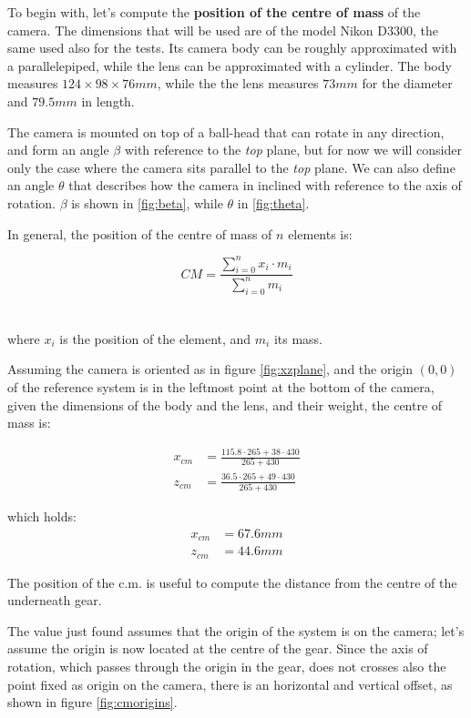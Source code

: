 \documentclass[]{article}
\begin{document}
To begin with, let's compute the \textbf{position of the centre of mass } of the camera. The dimensions that will be used are of the model Nikon D3300, the same used also for the tests. Its camera body can be roughly approximated with a parallelepiped, while the lens can be approximated with a cylinder. The body measures $124 \times 98 \times 76 mm$, while the the lens measures $73mm $ for the diameter and $79.5 mm$ in length.

The camera is mounted on top of a ball-head that can rotate in any direction, and form an angle $\beta$ with reference to the \textit{top} plane, but for now we will consider only the case where the camera sits parallel to the \textit{top} plane. We can also define an angle $\theta$ that describes how the camera in inclined with reference to the axis of rotation. $\beta$ is shown in \ref{fig:beta}, while $\theta$ in \ref{fig:theta}.


In general, the position of the centre of mass of $n$ elements is:

$$ CM = \frac{\sum_{i=0}^{n}x_i\cdot m_i}{\sum_{i=0}^{n} m_i} $$
\\
\\
where $x_i$ is the position of the element, and $m_i$ its mass.


Assuming the camera is oriented as in figure \ref{fig:xzplane}, and the origin $(0,0)$ of the reference system is in the leftmost point at the bottom of the camera, given the dimensions of the body and the lens, and their weight, the centre of mass is:

\begin{align*}
	x_{cm} & = \frac{115.8\cdot 265 + 38 \cdot 430}{265 + 430} \\ 
	z_{cm} & = \frac{36.5\cdot 265 + 49 \cdot 430}{265 + 430} 
\end{align*}

which holds:
\begin{align*}
	x_{cm} & = 67.6 mm \\
	z_{cm} & = 44.6 mm
\end{align*}

The position of the c.m. is useful to compute the distance from the centre of the underneath gear. 

The value just found assumes that the origin of the system is on the camera; let's assume the origin is now located at the centre of the gear. Since the axis of rotation, which passes through the origin in the gear, does not crosses also the point fixed as origin on the camera, there is an horizontal and vertical offset, as shown in figure \ref{fig:cmorigins}.
\end{document}
